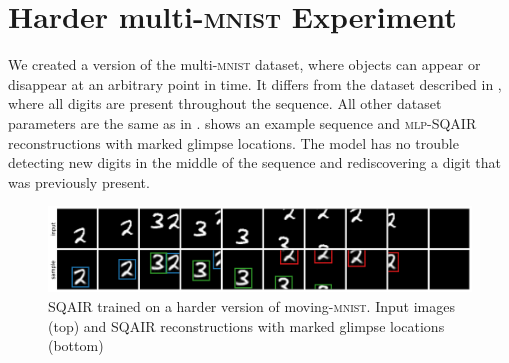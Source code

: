 \section{Harder multi-\textsc{mnist} Experiment}
\label{app:mnist_inout}
We created a version of the multi-\textsc{mnist} dataset, where objects can appear or disappear at an arbitrary point in time.
It differs from the dataset described in , where all digits are present throughout the sequence.
All other dataset parameters are the same as in .
 shows an example sequence and \textsc{mlp}-\gls{SQAIR} reconstructions with marked glimpse locations.
The model has no trouble detecting new digits in the middle of the sequence and rediscovering a digit that was previously present.

\begin{figure}
    \centering
    \includegraphics[width=\linewidth]{figures/SQAIR/mnist_rec/in_and_out.png}
    \caption{\gls{SQAIR} trained on a harder version of moving-\textsc{mnist}. Input images (top) and \gls{SQAIR} reconstructions with marked glimpse locations (bottom)}
    \label{fig:mnist_rec_in_and_out}
\end{figure}
